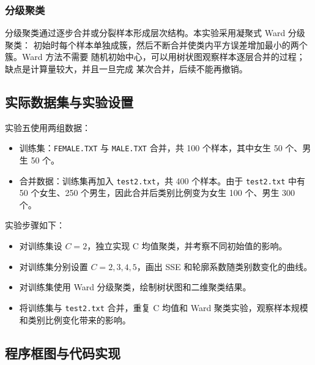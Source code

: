 \documentclass[UTF8,a4paper,12pt]{ctexart}
\begin{document}
\subsubsection{分级聚类}

分级聚类通过逐步合并或分裂样本形成层次结构。本实验采用凝聚式 Ward 分级聚类：
初始时每个样本单独成簇，然后不断合并使类内平方误差增加最小的两个簇。Ward 方法不需要
随机初始中心，可以用树状图观察样本逐层合并的过程；缺点是计算量较大，并且一旦完成
某次合并，后续不能再撤销。

\subsection{实际数据集与实验设置}

实验五使用两组数据：
\begin{itemize}
  \item 训练集：\texttt{FEMALE.TXT} 与 \texttt{MALE.TXT} 合并，共 100 个样本，其中女生 50 个、男生 50 个。
  \item 合并数据：训练集再加入 \texttt{test2.txt}，共 400 个样本。由于 \texttt{test2.txt} 中有 50 个女生、250 个男生，因此合并后类别比例变为女生 100 个、男生 300 个。
\end{itemize}

\begin{table}[H]
\centering
\caption{实验五使用的数据集统计}
\label{tab:exp5_dataset}
\small

\end{table}

实验步骤如下：
\begin{itemize}
  \item 对训练集设 $C=2$，独立实现 C 均值聚类，并考察不同初始值的影响。
  \item 对训练集分别设置 $C=2,3,4,5$，画出 SSE 和轮廓系数随类别数变化的曲线。
  \item 对训练集使用 Ward 分级聚类，绘制树状图和二维聚类结果。
  \item 将训练集与 \texttt{test2.txt} 合并，重复 C 均值和 Ward 聚类实验，观察样本规模和类别比例变化带来的影响。
\end{itemize}

\subsection{程序框图与代码实现}
\end{document}
